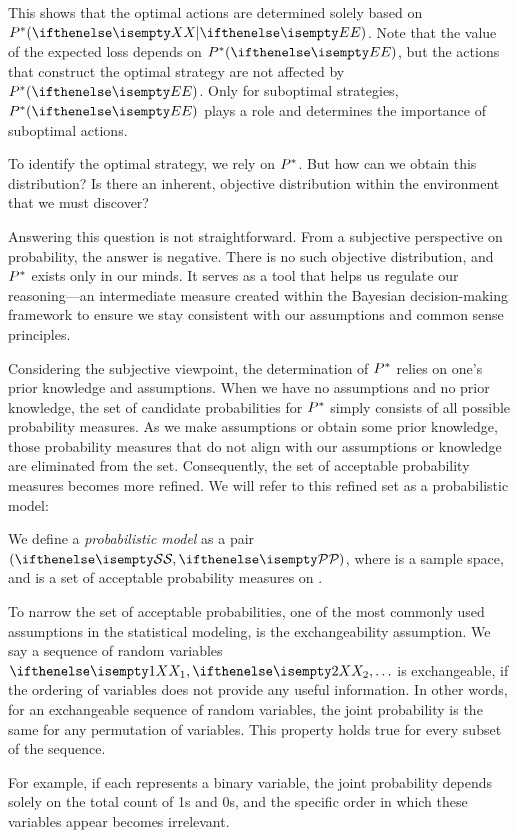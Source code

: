 This shows that the optimal actions are determined solely based on $\envDist(\XIE)$.
Note that the value of the expected loss depends on $\envDist(\E)$, but the actions that
construct the optimal strategy are not affected by $\envDist(\E)$.
Only for suboptimal strategies, $\envDist(\E)$ plays a role and determines the importance of suboptimal actions.

To identify the optimal strategy, we rely on $P^*$.
But how can we obtain this distribution?
Is there an inherent, objective distribution within the environment that we must discover?

Answering this question is not straightforward.
From a subjective perspective on probability, the answer is negative.
There is no such objective distribution, and $P^*$ exists only in our minds.
It serves as a tool that helps us regulate our reasoning---an intermediate measure created within the
Bayesian decision-making framework to ensure we stay consistent with our assumptions and common sense principles.

Considering the subjective viewpoint, the determination of $P^*$ relies on one’s prior knowledge and
assumptions.
When we have no assumptions and no prior knowledge, the set of candidate probabilities for $P^*$ simply
consists of all possible probability measures.
As we make assumptions or obtain some prior knowledge, those probability measures that do not align
with our assumptions or knowledge are eliminated from the set.
Consequently, the set of acceptable probability measures becomes more refined.
We will refer to this refined set as a probabilistic model:

\begin{definition}
    We define a \emph{probabilistic model} \M as a pair $\left(\set{S}, \set{P}\right)$, where  is a sample
    space, and  is a set of acceptable probability measures on .
\end{definition}

To narrow the set of acceptable probabilities, one of the most commonly used assumptions in the statistical modeling,
is the exchangeability assumption.
We say a sequence of random variables $\seqRvInf$ is exchangeable, if the ordering of variables does not provide any
useful information.
In other words, for an exchangeable sequence of random variables, the joint probability is the same
for any permutation of variables.
This property holds true for every subset of the sequence.

For example, if each  represents a binary variable, the joint probability depends solely on the total count
of 1s and 0s, and the specific order in which these variables appear becomes irrelevant.

